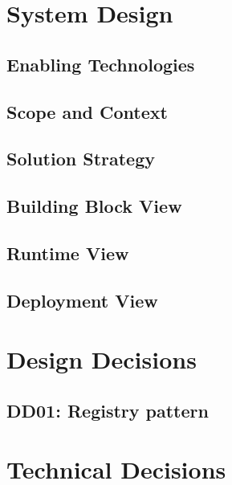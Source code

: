 \section{System Design}

\subsection{Enabling Technologies}

\subsection{Scope and Context}

\subsection{Solution Strategy}

\subsection{Building Block View}

\subsection{Runtime View}

\subsection{Deployment View}


\section{Design Decisions}

\subsection{DD01: Registry pattern}


\section{Technical Decisions}

